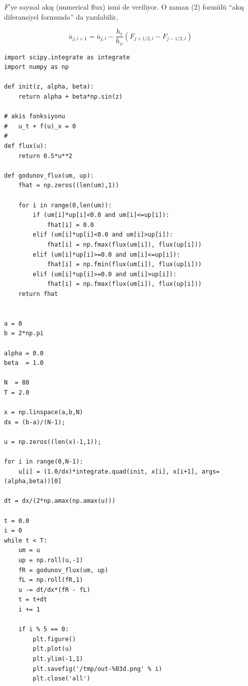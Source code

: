 \documentclass[12pt,fleqn]{article}\usepackage{../../common}
\begin{document}
$F$'ye sayısal akış (numerical flux) ismi de veriliyor. O zaman (2) formülü
``akış diferansiyel formunda'' da yazılabilir,

$$
\overline{u}_{j,l+1} = \overline{u}_{j,l} -
\frac{h_t}{h_x} ( F_{j+1/2,l} - F_{j-1/2,l} )
$$

\begin{verbatim}
import scipy.integrate as integrate
import numpy as np

def init(z, alpha, beta):
    return alpha + beta*np.sin(z)

# akis fonksiyonu 
#	u_t + f(u)_x = 0
#
def flux(u):
    return 0.5*u**2

def godunov_flux(um, up):
    fhat = np.zeros((len(um),1))

    for i in range(0,len(um)):
        if (um[i]*up[i]<0.0 and um[i]<=up[i]):
            fhat[i] = 0.0
        elif (um[i]*up[i]<0.0 and um[i]>up[i]):
            fhat[i] = np.fmax(flux(um[i]), flux(up[i]))
        elif (um[i]*up[i]>=0.0 and um[i]<=up[i]):
            fhat[i] = np.fmin(flux(um[i]), flux(up[i]))
        elif (um[i]*up[i]>=0.0 and um[i]>up[i]):
            fhat[i] = np.fmax(flux(um[i]), flux(up[i]))
    return fhat


a = 0
b = 2*np.pi

alpha = 0.0
beta  = 1.0

N  = 80
T = 2.0

x = np.linspace(a,b,N)     
dx = (b-a)/(N-1);  

u = np.zeros((len(x)-1,1)); 

for i in range(0,N-1):
    u[i] = (1.0/dx)*integrate.quad(init, x[i], x[i+1], args=(alpha,beta))[0]

dt = dx/(2*np.amax(np.amax(u)))

t = 0.0
i = 0
while t < T:
    um = u
    up = np.roll(u,-1)
    fR = godunov_flux(um, up) 
    fL = np.roll(fR,1)
    u -= dt/dx*(fR - fL)
    t = t+dt
    i += 1

    if i % 5 == 0:
        plt.figure()
        plt.plot(u)
        plt.ylim(-1,1)
        plt.savefig('/tmp/out-%03d.png' % i)
        plt.close('all')
\end{verbatim}
\end{document}
